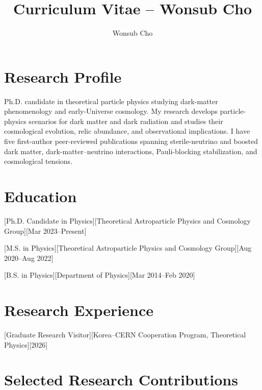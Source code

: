 \documentclass[10pt]{article}
\title{Curriculum Vitae -- Wonsub Cho}
\author{Wonsub Cho}
\date{}
\begin{document}
\makecvtitle

\section{Research Profile}

Ph.D. candidate in theoretical particle physics studying dark-matter phenomenology and early-Universe cosmology.
My research develops particle-physics scenarios for dark matter and dark radiation and studies their cosmological evolution, relic abundance, and observational implications.
I have five first-author peer-reviewed publications spanning sterile-neutrino and boosted dark matter, dark-matter--neutrino interactions, Pauli-blocking stabilization, and cosmological tensions.

\section{Education}

[Ph.D. Candidate in Physics][Theoretical Astroparticle Physics and Cosmology Group][Mar 2023--Present]

[M.S. in Physics][Theoretical Astroparticle Physics and Cosmology Group][Aug 2020--Aug 2022]

[B.S. in Physics][Department of Physics][Mar 2014--Feb 2020]

\section{Research Experience}

[Graduate Research Visitor][Korea--CERN Cooperation Program, Theoretical Physics][2026]

\section{Selected Research Contributions}
\end{document}
